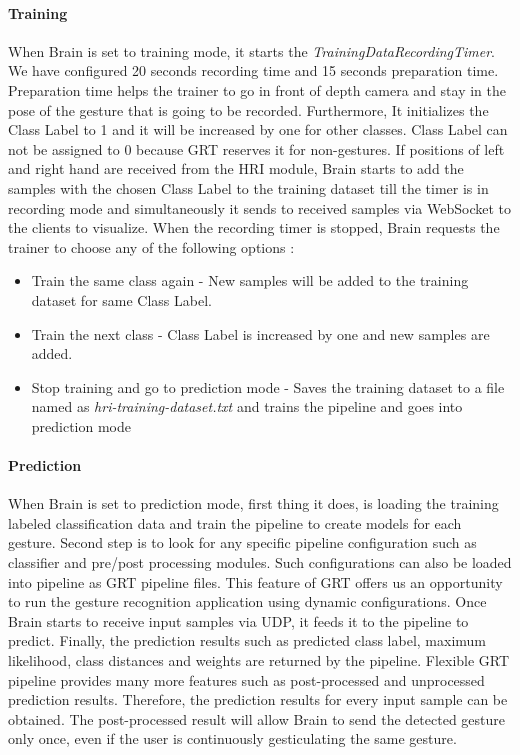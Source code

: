 \paragraph*{Training} When Brain is set to training mode, it starts the \textit{TrainingDataRecordingTimer}. We have configured 20 seconds recording time and 15 seconds preparation time. Preparation time helps the trainer to go in front of depth camera and stay in the pose of the gesture that is going to be recorded. Furthermore, It initializes the Class Label to 1 and it will be increased by one for other classes. Class Label can not be assigned to 0 because GRT reserves it for non-gestures. If positions of left and right hand are received from the HRI module, Brain starts to add the samples with the chosen Class Label to the training dataset till the timer is in recording mode and simultaneously it sends to received samples via WebSocket to the clients to visualize. When the recording timer is stopped, Brain requests the trainer to choose any of the following options :
\begin{itemize}
	\item Train the same class again - New samples will be added to the training dataset for same Class Label. 
	\item Train the next class - Class Label is increased by one and new samples are added. 
	\item Stop training and go to prediction mode - Saves the training dataset to a file named as \textit{hri-training-dataset.txt} and trains the pipeline and goes into prediction mode 
\end{itemize}

\paragraph*{Prediction} When Brain is set to prediction mode, first thing it does, is loading the training labeled classification data and train the pipeline to create models for each gesture. Second step is to look for any specific pipeline configuration such as classifier and pre/post processing modules. Such configurations can also be loaded into pipeline as GRT pipeline files. This feature of GRT offers us an opportunity to run the gesture recognition application using dynamic configurations. Once Brain starts to receive input samples via UDP, it feeds it to the pipeline to predict. Finally, the prediction results such as predicted class label, maximum likelihood, class distances and weights are returned by the pipeline. Flexible GRT pipeline provides many more features such as post-processed and unprocessed prediction results. Therefore, the prediction results for every input sample can be obtained. The post-processed result will allow Brain to send the detected gesture only once, even if the user is continuously gesticulating the same gesture. 

